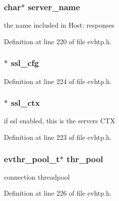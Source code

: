 \hypertarget{structevhtp__s_a4e06dd572147d48785afd0439576487a}{
\subsubsection[{server\_\-name}]{\setlength{\rightskip}{0pt plus 5cm}char$\ast$ {\bf server\_\-name}}}
\label{structevhtp__s_a4e06dd572147d48785afd0439576487a}
the name included in Host: responses 

Definition at line 220 of file evhtp.h.

\hypertarget{structevhtp__s_afb6cdde78523e94fa84f57e55280513f}{
\subsubsection[{ssl\_\-cfg}]{$\ast$ {\bf ssl\_\-cfg}}}
\label{structevhtp__s_afb6cdde78523e94fa84f57e55280513f}


Definition at line 224 of file evhtp.h.

\hypertarget{structevhtp__s_a21d5d9eef41ecdb08b82db795aa6da98}{
\subsubsection[{ssl\_\-ctx}]{$\ast$ {\bf ssl\_\-ctx}}}
\label{structevhtp__s_a21d5d9eef41ecdb08b82db795aa6da98}
if ssl enabled, this is the servers CTX 

Definition at line 223 of file evhtp.h.

\hypertarget{structevhtp__s_a350014aec537fdf8ef6f82efe17d5757}{
\subsubsection[{thr\_\-pool}]{\setlength{\rightskip}{0pt plus 5cm}evthr\_\-pool\_\-t$\ast$ {\bf thr\_\-pool}}}
\label{structevhtp__s_a350014aec537fdf8ef6f82efe17d5757}
connection threadpool 

Definition at line 226 of file evhtp.h.

